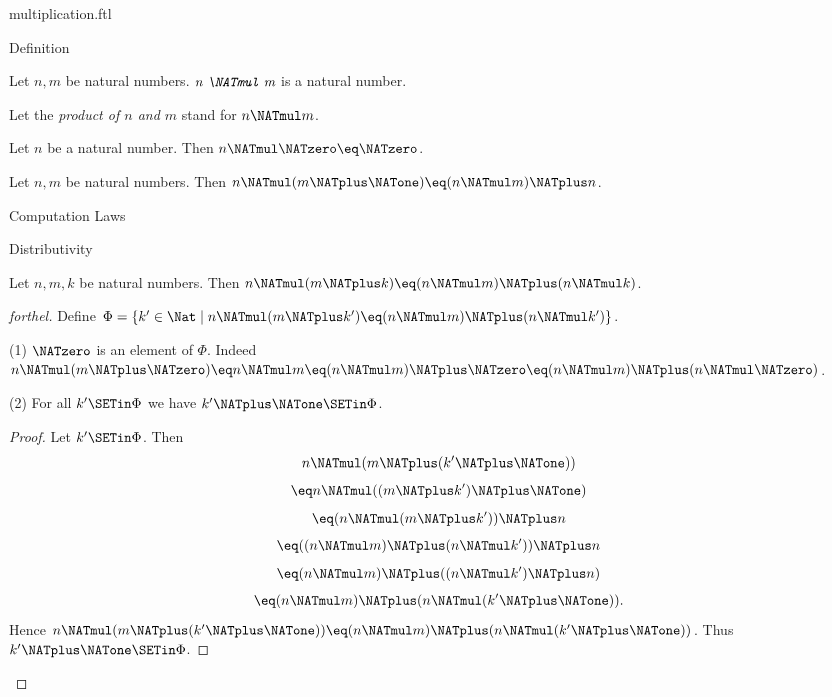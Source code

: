 \documentclass{naproche-library}
\begin{document}
\begin{smodule}[title=Multiplication]{multiplication.ftl}

\begin{sfragment}{Definition}
  \begin{signature}[forthel,id=ARITHMETIC_06_6626346484629504]
    Let $n, m$ be natural numbers.
    $\emph{n \NATmul m}$ is a natural number.

    Let the \emph{product of $n$ and $m$} stand for $n \NATmul m$.
  \end{signature}

  \begin{axiom}[forthel,id=ARITHMETIC_06_8941041092657152]
    Let $n$ be a natural number.
    Then $n \NATmul \NATzero \eq \NATzero$.
  \end{axiom}

  \begin{axiom}[forthel,id=ARITHMETIC_06_2211275408932864]
    Let $n, m$ be natural numbers.
    Then $n \NATmul (m \NATplus \NATone) \eq (n \NATmul m) \NATplus n$.
  \end{axiom}
\end{sfragment}

\begin{sfragment}{Computation Laws}
  \begin{sfragment}{Distributivity}
    \begin{proposition}[forthel,id=ARITHMETIC_06_9001524774567936]
      Let $n, m, k$ be natural numbers.
      Then $n \NATmul (m \NATplus k) \eq (n \NATmul m) \NATplus (n \NATmul k)$.
    \end{proposition}
    \begin{proof}[forthel]
      Define $\Phi = \{ k' \in \Nat \mid n \NATmul (m \NATplus k') \eq (n \NATmul m) \NATplus (n \NATmul k') \}$.

      (1) $\NATzero$ is an element of $\Phi$.
      Indeed $n \NATmul (m \NATplus \NATzero)
        \eq n \NATmul m
        \eq (n \NATmul m) \NATplus \NATzero
        \eq (n \NATmul m) \NATplus (n \NATmul \NATzero)$.

      (2) For all $k' \SETin \Phi$ we have $k' \NATplus \NATone \SETin \Phi$. 
      \begin{proof}
        Let $k'\SETin \Phi$.
        Then
        \[  n \NATmul (m \NATplus (k' \NATplus \NATone))                  \]
        \[    \eq n \NATmul ((m \NATplus k') \NATplus \NATone)              \]
        \[    \eq (n \NATmul (m \NATplus k')) \NATplus n              \]
        \[    \eq ((n \NATmul m) \NATplus (n \NATmul k')) \NATplus n    \]
        \[    \eq (n \NATmul m) \NATplus ((n \NATmul k') \NATplus n)    \]
        \[    \eq (n \NATmul m) \NATplus (n \NATmul (k' \NATplus \NATone)).   \]
        Hence $n \NATmul (m \NATplus (k' \NATplus \NATone)) \eq (n \NATmul m) \NATplus (n \NATmul (k' \NATplus \NATone))$.
        Thus $k' \NATplus \NATone \SETin \Phi$.
      \end{proof}


\end{proof}
\end{sfragment}
\end{sfragment}
\end{smodule}
\end{document}
